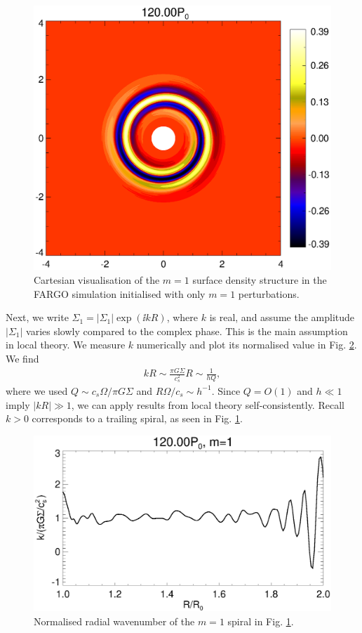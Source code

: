 \begin{figure}
  \includegraphics[width=\linewidth]{figures/polarxy2_dens120_fargo.ps}
  \caption{Cartesian visualisation of the $m=1$ surface density
    structure in the FARGO simulation initialised with only $m=1$
    perturbations. 
    \label{2d_fargo_viz}} 
\end{figure}   

Next, we write $\Sigma_1 = 
|\Sigma_1|\exp{(\ii kR)}$, where $k$ is real, and assume the amplitude
$|\Sigma_1|$ varies slowly compared to the complex phase. This is the
main assumption in local theory. We measure $k$ numerically and plot
its normalised value in Fig. \ref{fargo_wavenumber}. We find 
\begin{align*}
  kR \sim \frac{\pi G \Sigma}{c_s^2}R \sim \frac{1}{hQ}, 
\end{align*}
where we used $Q\sim c_s\Omega/\pi G \Sigma$ and $R\Omega/c_s\sim
h^{-1}$. Since $Q=O(1)$ and $h\ll 1$ imply $|kR|\gg 1$, we 
can apply results from local theory self-consistently. Recall $k>0$
corresponds to a trailing spiral, as seen in Fig. \ref{2d_fargo_viz}.  

\begin{figure}
  \includegraphics[width=\linewidth]{figures/m1_analysis_kr120_fargo.ps}
  \caption{Normalised radial wavenumber of the $m=1$ spiral in 
    Fig. \ref{2d_fargo_viz}.\label{fargo_wavenumber}} 
\end{figure}   

